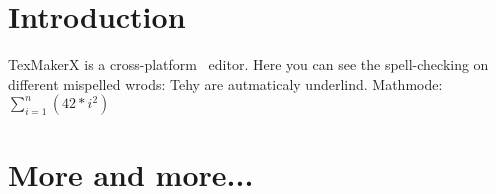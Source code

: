 \documentclass[10pt,a4paper]{article}
\begin{document}
\section{Introduction}
TexMakerX is a cross-platform \LATeX ~editor.
Here you can see the spell-checking on different mispelled wrods: Tehy are autmaticaly underlind.
Mathmode: $\sum\limits^n_{i=1}\left(42*i^2\right)$
\section{More and more...}
\suction 
\end{document}
